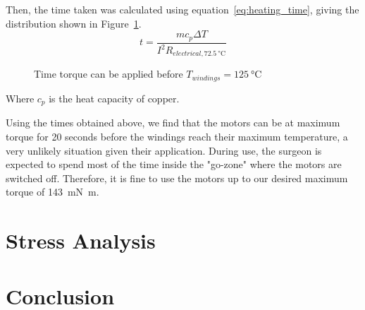 Then, the time taken was calculated using equation~\ref{eq:heating_time}, giving the distribution shown in Figure~\ref{fig:overheating_times}.
\\
\begin{equation}
  t = \frac{m c_p \Delta T}{I^2 R_{electrical, \SI{72.5}{\celsius}}}
  \label{eq:heating_time}
\end{equation}

\begin{figure}
  
  \caption{Time torque can be applied before $T_{windings} = \SI{125}{\celsius}$}
  \label{fig:overheating_times}
\end{figure}

Where $c_p$ is the heat capacity of copper.

Using the times obtained above, we find that the motors can be at maximum torque for 20 seconds before the windings reach their maximum temperature, a very unlikely situation given their application. During use, the surgeon is expected to spend most of the time inside the "go-zone" where the motors are switched off.
Therefore, it is fine to use the motors up to our desired maximum torque of \SI{143}{\milli\newton\metre}.



\section{Stress Analysis} %
\label{sec:stress_analysis}


\section{Conclusion} %
\label{sec:conclusion}

